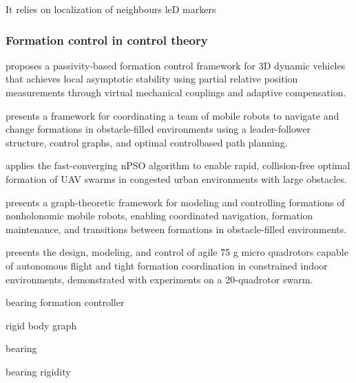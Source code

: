 It relies on localization of neighbours
\cite{walter2018fast} %
leD markers
\cite{ulrich2022towards} %

\subsubsection{Formation control in control theory}

\cite{stacey2015passivity} proposes a passivity-based formation control framework for 3D dynamic vehicles that achieves local asymptotic stability using partial relative position measurements through virtual mechanical couplings and adaptive compensation.

\cite{desai1999control} presents a framework for coordinating a team of mobile robots to navigate and change formations in obstacle-filled environments using a leader-follower structure, control graphs, and optimal control\-based path planning.

\cite{spanogianopoulos2017fast} applies the fast-converging nPSO algorithm to enable rapid, collision-free optimal formation of UAV swarms in congested urban environments with large obstacles.

\cite{desai2002modeling} presents a graph-theoretic framework for modeling and controlling formations of nonholonomic mobile robots, enabling coordinated navigation, formation maintenance, and transitions between formations in obstacle-filled environments.

\cite{kushleyev2013towards} presents the design, modeling, and control of agile 75 g micro quadrotors capable of autonomous flight and tight formation coordination in constrained indoor environments, demonstrated with experiments on a 20-quadrotor swarm.

\cite{schiano2016rigidity} bearing formation controller

rigid body graph
\cite{yang2018growing}
\cite{mehdifar2018finite}

bearing
\cite{zhao2015translational}
\cite{zhao2015bearing}
\cite{li2020adaptive}
\cite{li2021adaptive}
\cite{li2020bearing}
\cite{zhao2021finite}
\cite{zhang2022distributed}
\cite{zhang2023bearing}
\cite{arrigoni2018bearing}
\cite{zhao2019bearing}
\cite{trinh2018bearing}
\cite{trinh2021finite}

bearing rigidity
\cite{tay1985generating}
\cite{eren2012formation}
\cite{trinh2019minimal}
\cite{karimian2017theory}
\cite{hou2016elementary}
\cite{carboni2014rigidity}

